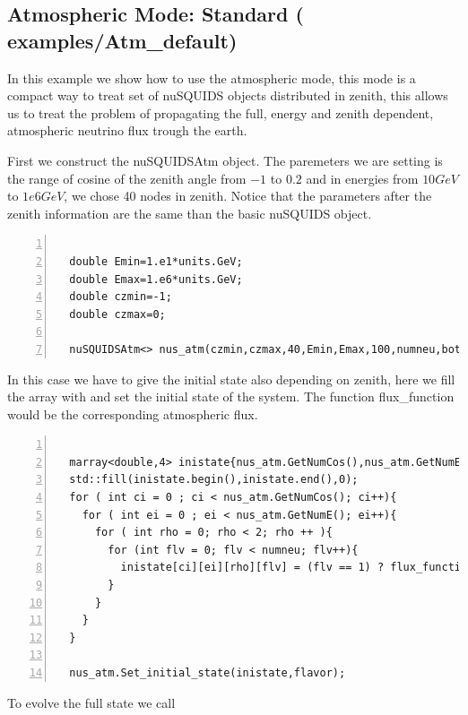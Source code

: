 \subsection{Atmospheric Mode: Standard \textnormal{({\ttf
      examples/Atm\_default})}}
In this example we show how to use the atmospheric mode, this mode is
a compact way to treat set of nuSQUIDS objects distributed in zenith, this
allows us to treat the problem of propagating the full, energy and
zenith dependent, atmospheric neutrino flux trough the earth.

First we construct the nuSQUIDSAtm object. The paremeters we are
setting is the range of cosine of the zenith angle from $-1$ to $0.2$
and in energies from $10GeV$ to $1e6GeV$, we chose 40 nodes in zenith.
Notice that the parameters after the zenith information are the same
than the basic nuSQUIDS object.

\begin{lstlisting}[frame=leftline, numbers =
  left,breaklines=true,label = ex:sin1]

  double Emin=1.e1*units.GeV;
  double Emax=1.e6*units.GeV;
  double czmin=-1;
  double czmax=0;

  nuSQUIDSAtm<> nus_atm(czmin,czmax,40,Emin,Emax,100,numneu,both,true,interactions);

\end{lstlisting}

In this case we have to give the initial state also depending on
zenith, here we fill the array with and set the initial state of the
system. The function {\ttf flux\_function} would be the corresponding
atmospheric flux.

\begin{lstlisting}[frame=leftline, numbers =
  left,breaklines=true,label = ex:sin1,firstnumber=last]

  marray<double,4> inistate{nus_atm.GetNumCos(),nus_atm.GetNumE(),2,numneu};
  std::fill(inistate.begin(),inistate.end(),0);
  for ( int ci = 0 ; ci < nus_atm.GetNumCos(); ci++){
    for ( int ei = 0 ; ei < nus_atm.GetNumE(); ei++){
      for ( int rho = 0; rho < 2; rho ++ ){
        for (int flv = 0; flv < numneu; flv++){
          inistate[ci][ei][rho][flv] = (flv == 1) ? flux_function(e_range[ei], cz_range[ci]) : 0.0;//set 1 only to the muon flavor
        }
      }
    }
  }

  nus_atm.Set_initial_state(inistate,flavor);

\end{lstlisting}


To evolve the full state we call

